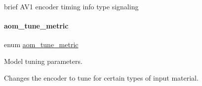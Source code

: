 brief A\+V1 encoder timing info type signaling \mbox{\label{group__aom__encoder_gaafd352cc596fab5388558950f8bbe739}} 
\paragraph{\texorpdfstring{aom\+\_\+tune\+\_\+metric}{aom\_tune\_metric}}
{\footnotesize\ttfamily enum \hyperlink{group__aom__encoder_gaafd352cc596fab5388558950f8bbe739}{aom\+\_\+tune\+\_\+metric}}



Model tuning parameters. 

Changes the encoder to tune for certain types of input material. 